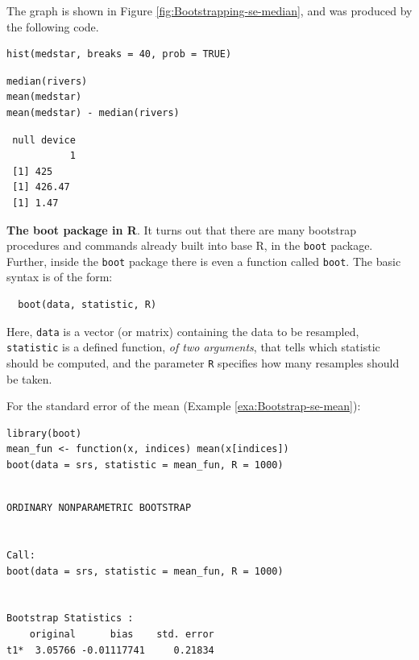 \documentclass[captions=tableheading]{scrbook}
\begin{document}
\begin{example}
The graph is shown in Figure \ref{fig:Bootstrapping-se-median}, and was produced by the following code.


\begin{verbatim}
hist(medstar, breaks = 40, prob = TRUE)
\end{verbatim}


\begin{verbatim}
median(rivers)
mean(medstar)
mean(medstar) - median(rivers)
\end{verbatim}

\begin{verbatim}
 null device 
           1
 [1] 425
 [1] 426.47
 [1] 1.47
\end{verbatim}

\end{example}

\begin{example}
\textbf{The boot package in R}. It turns out that there are many bootstrap procedures and commands already built into base \textsf{R}, in the \texttt{boot} package. Further, inside the \texttt{boot} package there is even a function called \texttt{boot}. The basic syntax is of the form:

\begin{verbatim}
  boot(data, statistic, R)
\end{verbatim}

\end{example}
 Here, \texttt{data} is a vector (or matrix) containing the data to be resampled, \texttt{statistic} is a defined function, \emph{of two arguments}, that tells which statistic should be computed, and the parameter \texttt{R} specifies how many resamples should be taken.

For the standard error of the mean (Example \ref{exa:Bootstrap-se-mean}):


\begin{verbatim}
library(boot)
mean_fun <- function(x, indices) mean(x[indices])
boot(data = srs, statistic = mean_fun, R = 1000)
\end{verbatim}


\begin{verbatim}
 
ORDINARY NONPARAMETRIC BOOTSTRAP


Call:
boot(data = srs, statistic = mean_fun, R = 1000)


Bootstrap Statistics :
    original      bias    std. error
t1*  3.05766 -0.01117741     0.21834
\end{verbatim}
\end{document}
